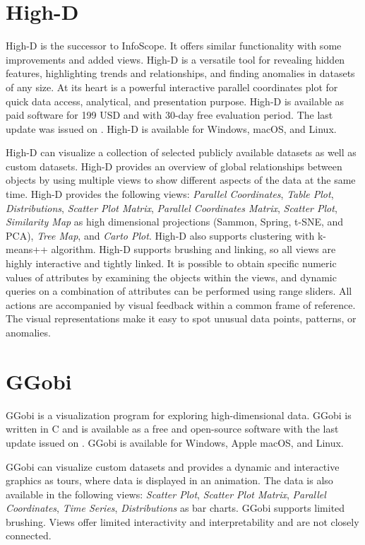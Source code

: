 \section{High-D}

High-D \parencite{HighD} is the successor to InfoScope. It offers similar
functionality with some improvements and added views. High-D is a versatile tool
for revealing hidden features, highlighting trends and relationships, and
finding anomalies in datasets of any size. At its heart is a powerful
interactive parallel coordinates plot for quick data access, analytical, and
presentation purpose. High-D is available as paid software for 199 USD and with
30-day free evaluation period. The last update was issued on
. High-D is available for Windows, macOS, and Linux.


High-D can visualize a collection of selected publicly available
datasets as well as custom datasets. High-D provides an overview of
global relationships between objects by using multiple views to show
different aspects of the data at the same time. High-D provides the
following views: \emph{Parallel Coordinates}, \emph{Table Plot},
\emph{Distributions}, \emph{Scatter Plot Matrix}, \emph{Parallel
Coordinates Matrix}, \emph{Scatter Plot}, \emph{Similarity Map} as
high dimensional projections (Sammon, Spring, t-SNE, and PCA),
\emph{Tree Map}, and \emph{Carto Plot}. High-D also supports
clustering with k-means++ algorithm. High-D supports brushing and
linking, so all views are highly interactive and tightly linked. It is
possible to obtain specific numeric values of attributes by examining
the objects within the views, and dynamic queries on a combination of
attributes can be performed using range sliders. All actions are
accompanied by visual feedback within a common frame of reference. The
visual representations make it easy to spot unusual data points,
patterns, or anomalies.




\section{GGobi}

GGobi \parencite{cook2007interactive} is a visualization program for
exploring high-dimensional data. GGobi is written in C and is
available as a free and open-source software with the last update
issued on . GGobi is available for Windows, Apple macOS,
and Linux.

GGobi can visualize custom datasets and provides a dynamic and
interactive graphics as tours, where data is displayed in an
animation. The data is also available in the following views:
\emph{Scatter Plot}, \emph{Scatter Plot Matrix}, \emph{Parallel
Coordinates}, \emph{Time Series}, \emph{Distributions} as bar
charts. GGobi supports limited brushing. Views offer limited
interactivity and interpretability and are not closely connected.


